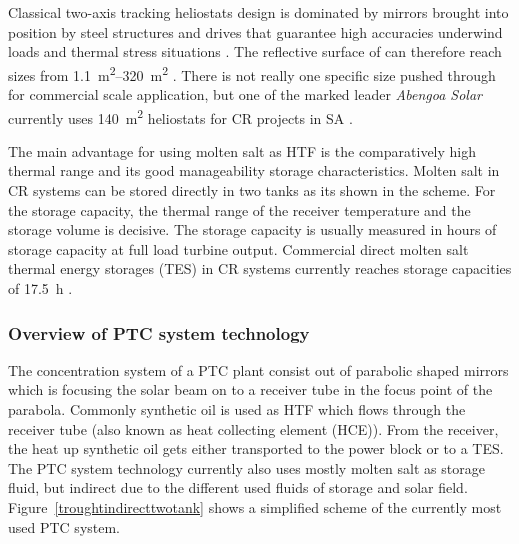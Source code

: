 Classical two-axis tracking heliostats design is dominated by mirrors brought into position by steel structures and drives that guarantee high accuracies underwind loads and thermal stress situations \cite{Alexopoulos2013}. The reflective surface of can therefore reach sizes from \SIrange{1.1}{320}{\square\metre} \cite{Blackmon2012,Tyner2014}. There is not really one specific size pushed through for commercial scale application, but one of the marked leader \emph{Abengoa Solar} currently uses \SI{140}{\square\metre} heliostats for CR projects in SA \cite{Abengoa2014}.

The main advantage for using molten salt as HTF is the comparatively high thermal range and its good manageability storage characteristics. Molten salt in CR systems can be stored directly in two tanks as its shown in the scheme. For the storage capacity, the thermal range of the receiver temperature and the storage volume is decisive. The storage capacity is usually measured in hours of storage capacity at full load turbine output. Commercial direct molten salt thermal energy storages (TES) in CR systems currently reaches storage capacities of \SI{17.5}{\hour} \cite{NREL2015b}.

\subsubsection{Overview of PTC system technology} 
The concentration system of a PTC plant consist out of parabolic shaped mirrors which is focusing the solar beam on to a receiver tube in the focus point of the parabola. Commonly synthetic oil is used as HTF which flows through the receiver tube (also known as heat collecting element (HCE)). From the receiver, the heat up synthetic oil gets either transported to the power block or to a TES. The PTC system technology currently also uses mostly molten salt as storage fluid, but indirect due to the different used fluids of storage and solar field. Figure~\ref{troughtindirecttwotank} shows a simplified scheme of the currently most used PTC system.

